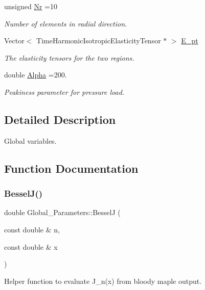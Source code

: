 \begin{DoxyCompactItemize}
unsigned \hyperlink{namespaceGlobal__Parameters_aeebb1e39d849d32cebdc9be13026606e}{Nr} =10
\begin{DoxyCompactList}\small\item\em Number of elements in radial direction. \end{DoxyCompactList}\item 
Vector$<$ Time\+Harmonic\+Isotropic\+Elasticity\+Tensor $\ast$ $>$ \hyperlink{namespaceGlobal__Parameters_a73c731fa617a9d92851e4195493262e7}{E\+\_\+pt}
\begin{DoxyCompactList}\small\item\em The elasticity tensors for the two regions. \end{DoxyCompactList}\item 
double \hyperlink{namespaceGlobal__Parameters_afbe27ad463a1fb23cb99d029a9fac731}{Alpha} =200.
\begin{DoxyCompactList}\small\item\em Peakiness parameter for pressure load. \end{DoxyCompactList}\end{DoxyCompactItemize}


\subsection{Detailed Description}
Global variables. 

\subsection{Function Documentation}
\mbox{\label{namespaceGlobal__Parameters_aa3dda8c7600df01ddcd31b966230c5ba}} 
\subsubsection{\texorpdfstring{Bessel\+J()}{BesselJ()}}
{\footnotesize\ttfamily double Global\+\_\+\+Parameters\+::\+BesselJ (\begin{DoxyParamCaption}\item[{const double \&}]{n,  }\item[{const double \&}]{x }\end{DoxyParamCaption})}



Helper function to evaluate J\+\_\+n(x) from bloody maple output. 



